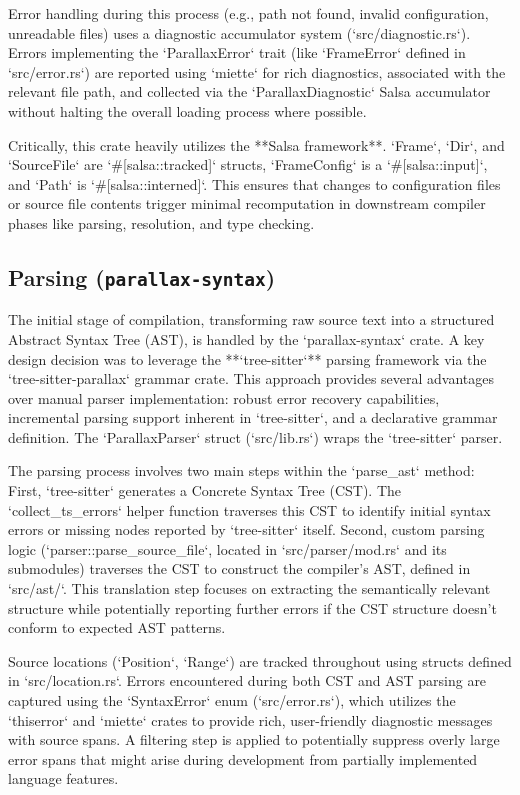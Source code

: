 Error handling during this process (e.g., path not found, invalid configuration, unreadable files) uses a diagnostic accumulator system (`src/diagnostic.rs`). Errors implementing the `ParallaxError` trait (like `FrameError` defined in `src/error.rs`) are reported using `miette` for rich diagnostics, associated with the relevant file path, and collected via the `ParallaxDiagnostic` Salsa accumulator without halting the overall loading process where possible.

Critically, this crate heavily utilizes the **Salsa framework**. `Frame`, `Dir`, and `SourceFile` are `#[salsa::tracked]` structs, `FrameConfig` is a `#[salsa::input]`, and `Path` is `#[salsa::interned]`. This ensures that changes to configuration files or source file contents trigger minimal recomputation in downstream compiler phases like parsing, resolution, and type checking.

\subsection{Parsing (\texttt{parallax-syntax})} %
The initial stage of compilation, transforming raw source text into a structured Abstract Syntax Tree (AST), is handled by the `parallax-syntax` crate. A key design decision was to leverage the **`tree-sitter`** parsing framework via the `tree-sitter-parallax` grammar crate. This approach provides several advantages over manual parser implementation: robust error recovery capabilities, incremental parsing support inherent in `tree-sitter`, and a declarative grammar definition. The `ParallaxParser` struct (`src/lib.rs`) wraps the `tree-sitter` parser.

The parsing process involves two main steps within the `parse_ast` method: First, `tree-sitter` generates a Concrete Syntax Tree (CST). The `collect_ts_errors` helper function traverses this CST to identify initial syntax errors or missing nodes reported by `tree-sitter` itself. Second, custom parsing logic (`parser::parse_source_file`, located in `src/parser/mod.rs` and its submodules) traverses the CST to construct the compiler's AST, defined in `src/ast/`. This translation step focuses on extracting the semantically relevant structure while potentially reporting further errors if the CST structure doesn't conform to expected AST patterns.

Source locations (`Position`, `Range`) are tracked throughout using structs defined in `src/location.rs`. Errors encountered during both CST and AST parsing are captured using the `SyntaxError` enum (`src/error.rs`), which utilizes the `thiserror` and `miette` crates to provide rich, user-friendly diagnostic messages with source spans. A filtering step is applied to potentially suppress overly large error spans that might arise during development from partially implemented language features.

